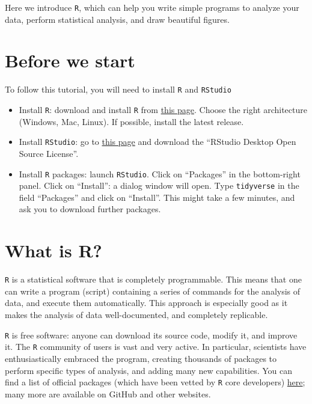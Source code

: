 \documentclass[
  letterpaper,
  DIV=11,
  numbers=noendperiod]{scrreprt}
\providecommand{\tightlist}{%
  \setlength{\itemsep}{0pt}\setlength{\parskip}{0pt}}\usepackage{longtable,booktabs,array}
\begin{document}
Here we introduce \texttt{R}, which can help you write simple programs
to analyze your data, perform statistical analysis, and draw beautiful
figures.

\hypertarget{before-we-start}{%
\section{Before we start}\label{before-we-start}}

To follow this tutorial, you will need to install \texttt{R} and
\texttt{RStudio}

\begin{itemize}
\tightlist
\item
  Install \texttt{R}: download and install \texttt{R} from
  \href{https://cran.r-project.org/}{this page}. Choose the right
  architecture (Windows, Mac, Linux). If possible, install the latest
  release.
\item
  Install \texttt{RStudio}: go to
  \href{https://www.rstudio.com/products/rstudio/download/}{this page}
  and download the ``RStudio Desktop Open Source License''.
\item
  Install \texttt{R} packages: launch \texttt{RStudio}. Click on
  ``Packages'' in the bottom-right panel. Click on ``Install'': a dialog
  window will open. Type \texttt{tidyverse} in the field ``Packages''
  and click on ``Install''. This might take a few minutes, and ask you
  to download further packages.
\end{itemize}

\hypertarget{what-is-r}{%
\section{What is R?}\label{what-is-r}}

\texttt{R} is a statistical software that is completely programmable.
This means that one can write a program (script) containing a series of
commands for the analysis of data, and execute them automatically. This
approach is especially good as it makes the analysis of data
well-documented, and completely replicable.

\texttt{R} is free software: anyone can download its source code, modify
it, and improve it. The \texttt{R} community of users is vast and very
active. In particular, scientists have enthusiastically embraced the
program, creating thousands of packages to perform specific types of
analysis, and adding many new capabilities. You can find a list of
official packages (which have been vetted by \texttt{R} core developers)
\href{https://cran.r-project.org/web/packages/available_packages_by_name.html}{here};
many more are available on GitHub and other websites.
\end{document}
